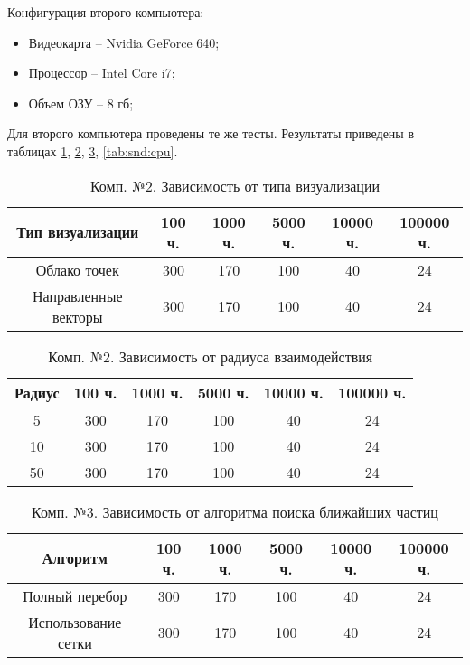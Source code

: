 Конфигурация второго компьютера:

\begin{itemize}
  \item Видеокарта -- Nvidia GeForce 640;
  \item Процессор -- Intel Core i7;
  \item Объем ОЗУ -- 8 гб;
\end{itemize}

Для второго компьютера проведены те же тесты. Результаты приведены в таблицах
\ref{tab:snd:simple}, \ref{tab:snd:radius}, \ref{tab:snd:algorithm}, \ref{tab:snd:cpu}.

\begin{table}[H]
  \caption{\label{tab:snd:simple}Комп. №2. Зависимость от типа визуализации}
  \begin{center}
    \begin{tabular}{|c|c|c|c|c|c|}
      \hline
      Тип визуализации & 100 ч. & 1000 ч. & 5000 ч. & 10000 ч. & 100000 ч. \\
      \hline
      Облако точек & 300 & 170 & 100 & 40 & 24 \\
      Направленные векторы & 300 & 170 & 100 & 40 & 24 \\
      \hline
    \end{tabular}
  \end{center}
\end{table}

\begin{table}[H]
  \caption{\label{tab:snd:radius}Комп. №2. Зависимость от радиуса взаимодействия}
  \begin{center}
    \begin{tabular}{|c|c|c|c|c|c|}
      \hline
      Радиус & 100 ч. & 1000 ч. & 5000 ч. & 10000 ч. & 100000 ч. \\
      \hline
      5 & 300 & 170 & 100 & 40 & 24 \\
      10 & 300 & 170 & 100 & 40 & 24 \\
      50 & 300 & 170 & 100 & 40 & 24 \\
      \hline
    \end{tabular}
  \end{center}
\end{table}

\begin{table}[H]
  \caption{\label{tab:snd:algorithm}Комп. №3. Зависимость от алгоритма поиска ближайших частиц}
  \begin{center}
    \begin{tabular}{|c|c|c|c|c|c|}
      \hline
      Алгоритм & 100 ч. & 1000 ч. & 5000 ч. & 10000 ч. & 100000 ч. \\
      \hline
      Полный перебор & 300 & 170 & 100 & 40 & 24 \\
      Использование сетки & 300 & 170 & 100 & 40 & 24 \\
      \hline
    \end{tabular}
  \end{center}
\end{table}

